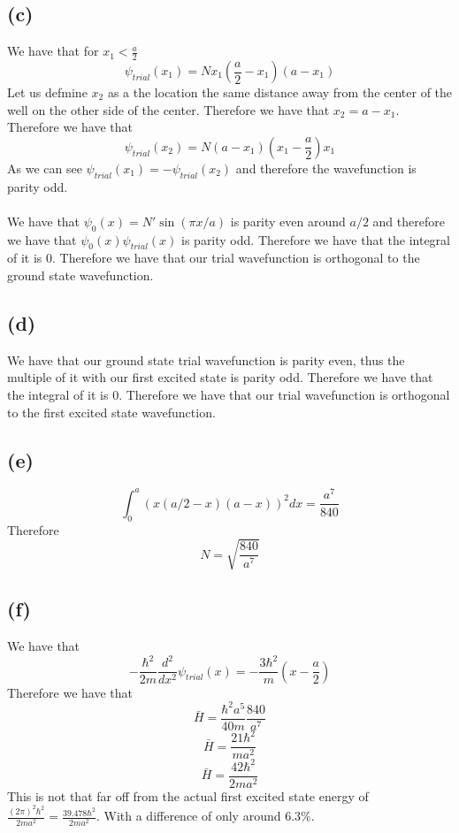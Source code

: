 \documentclass[11pt]{article}
\begin{document}
\subsection*{(c)}
We have that for $x_1<\frac{a}{2}$
$$\psi_{trial}(x_1) = Nx_1(\frac{a}{2}-x_1)(a-x_1)$$
Let us defmine $x_2$ as a the location the same distance away from the center 
of the well on the other side of the center. Therefore we have that
$x_2 = a-x_1$. Therefore we have that
$$\psi_{trial}(x_2) = N(a-x_1)(x_1-\frac{a}{2})x_1$$
As we can see $\psi_{trial}(x_1) = -\psi_{trial}(x_2)$ and therefore
the wavefunction is parity odd. \\\\
We have that $\psi_{0}(x) = N'\sin(\pi x/a)$ is parity even around $a/2$
and therefore we have that 
$\psi_0(x)\psi_{trial}(x)$ is parity odd. Therefore we have that the integral of 
it is $0$. Therefore we have that our trial wavefunction is orthogonal to the
ground state wavefunction.
\subsection*{(d)}
We have that our ground state trial wavefunction is parity even,
thus the multiple of it with our first excited state is parity odd.
Therefore we have that the integral of it is $0$. Therefore we have that our trial wavefunction is orthogonal to the
first excited state wavefunction.
\subsection*{(e)}
$$\int_{0}^{a} (x(a/2-x)(a-x))^2 dx = \frac{a^7}{840}$$
Therefore $$N=\sqrt{\frac{840}{a^7}}$$
\subsection*{(f)}
We have that 
$$-\frac{\hbar^2}{2m}\frac{d^2}{dx^2}\psi_{trial}(x) = -\frac{3\hbar^2}{m}\left(x-\frac{a}{2}\right)$$
Therefore we have that 
$$\bar{H} = \frac{\hbar^2 a^5}{40m} \frac{840}{a^7}$$
$$\bar{H} = \frac{21\hbar^2}{ma^2}$$
$$\bar{H} = \frac{42\hbar^2}{2ma^2}$$
This is not that far off from the actual first excited state 
energy of $\frac{(2\pi)^2\hbar^2}{2ma^2}=\frac{39.478\hbar^2}{2ma^2}$. With a difference of only 
around $6.3\%$.


\end{document}
